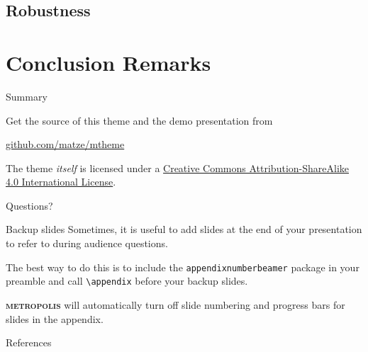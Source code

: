 \documentclass[10pt]{beamer}
\newcommand{\themename}{\textbf{\textsc{metropolis}}\xspace}
\begin{document}
\subsection{Robustness}
\section{Conclusion Remarks}
\begin{frame}{Summary}

  Get the source of this theme and the demo presentation from

  \begin{center}\url{github.com/matze/mtheme}\end{center}

  The theme \emph{itself} is licensed under a
  \href{http://creativecommons.org/licenses/by-sa/4.0/}{Creative Commons
  Attribution-ShareAlike 4.0 International License}.

  \begin{center}\ccbysa\end{center}

\end{frame}

{
\begin{frame}[standout]
  Questions?
\end{frame}
}

\appendix

\begin{frame}[fragile]{Backup slides}
  Sometimes, it is useful to add slides at the end of your presentation to
  refer to during audience questions.

  The best way to do this is to include the \verb|appendixnumberbeamer|
  package in your preamble and call \verb|\appendix| before your backup slides.

  \themename will automatically turn off slide numbering and progress bars for
  slides in the appendix.
\end{frame}

\begin{frame}[allowframebreaks]{References}

  
  

\end{frame}
\end{document}
